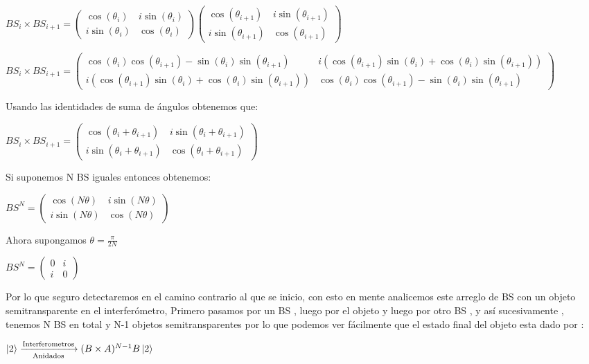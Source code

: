 \documentclass[11pt]{article}
\begin{document}
$BS_{i} \times BS_{i+1}=\begin{pmatrix} \cos(\theta_{i}) & i \sin(\theta_{i}) \\ i \sin(\theta_{i}) & \cos(\theta_{i}) \end
{pmatrix}  
\begin{pmatrix} \cos(\theta_{i+1}) & i \sin(\theta_{i+1}) \\ i \sin(\theta_{i+1}) & \cos(\theta_{i+1}) \end
{pmatrix}$

$BS_{i} \times BS_{i+1}=\begin{pmatrix} \cos(\theta_{i})\cos(\theta_{i+1})-\sin(\theta_{i})\sin(\theta_{i+1}) & i (\cos(\theta_{i+1})\sin(\theta_{i})+\cos(\theta_{i})\sin(\theta_{i+1})) \\ i (\cos(\theta_{i+1})\sin(\theta_{i})+\cos(\theta_{i})\sin(\theta_{i+1}))& \cos(\theta_{i})\cos(\theta_{i+1})-\sin(\theta_{i})\sin(\theta_{i+1}) \end{pmatrix}$

Usando las identidades de suma de ángulos obtenemos que:

$BS_{i} \times BS_{i+1}=\begin{pmatrix} \cos(\theta_{i}+\theta_{i+1}) & i \sin(\theta_{i}+\theta_{i+1}) \\ i \sin(\theta_{i}+\theta_{i+1}) & \cos(\theta_{i}+\theta_{i+1}) \end{pmatrix} $

Si suponemos N BS iguales entonces obtenemos:

$BS^{N}=\begin{pmatrix} \cos(N\theta) & i \sin(N\theta) \\ i \sin(N\theta) & \cos(N\theta) \end{pmatrix}$

Ahora supongamos $\theta=\frac{\pi}{2N}$

$BS^{N}=\begin{pmatrix} 0 & i  \\ i  & 0 \end{pmatrix}$

Por lo que seguro detectaremos en el camino contrario al que se inicio, con esto en mente analicemos este arreglo de BS con un objeto semitransparente en el interferómetro, Primero pasamos por un BS , luego por el objeto y luego por otro BS , y así sucesivamente , tenemos N BS en total y N-1 objetos semitransparentes por lo que podemos ver fácilmente que el estado final del objeto esta dado por :

$\ket{2}\xrightarrow[\text{Anidados}]{\text{Interferometros}}(B \times A)^{N-1}B \ket{2}$
\end{document}
